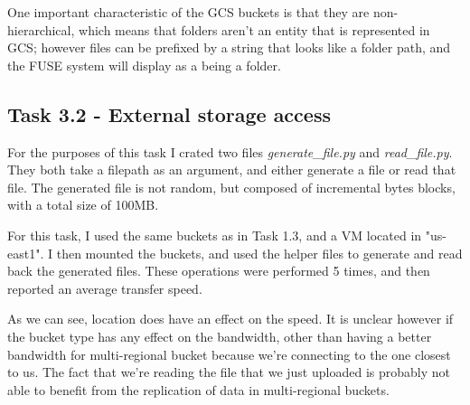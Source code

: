 \documentclass[paper=a4, fontsize=11pt]{scrartcl}
\numberwithin{equation}{section}    %
\numberwithin{figure}{section}      %
\numberwithin{table}{section}       %
\begin{document}
One important characteristic of the GCS buckets is that they are non-hierarchical, which means that folders aren't an entity that is represented in GCS; however files can be prefixed by a string that looks like a folder path, and the FUSE system will display as a being a folder.

\subsection{Task 3.2 - External storage access}

For the purposes of this task I crated two files \textit{generate\_file.py} and \textit{read\_file.py}. They both take a filepath as an argument, and either generate a file or read that file. The generated file is not random, but composed of incremental bytes blocks, with a total size of 100MB.

For this task, I used the same buckets as in Task 1.3, and a VM located in "us-east1".
I then mounted the buckets, and used the helper files to generate and read back the generated files. These operations were performed 5 times, and then reported an average transfer speed.

As we can see, location does have an effect on the speed. It is unclear however if the bucket type has any effect on the bandwidth, other than having a better bandwidth for multi-regional bucket because we're connecting to the one closest to us. The fact that we're reading the file that we just uploaded is probably not able to benefit from the replication of data in multi-regional buckets.
\end{document}

